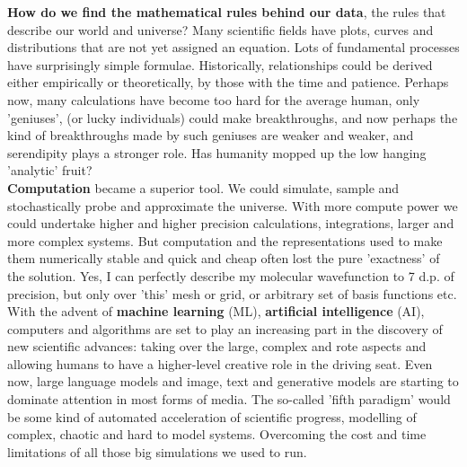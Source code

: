\documentclass{article}
\begin{document}
\textbf{How do we find the mathematical rules behind our data}, the rules that describe our world and universe? Many scientific fields have plots, curves and distributions that are not yet assigned an equation. Lots of fundamental processes have surprisingly simple formulae. Historically, relationships could be derived either empirically or theoretically, by those with the time and patience. Perhaps now, many calculations have become too hard for the average human, only 'geniuses', (or lucky individuals) could make breakthroughs, and now perhaps the kind of breakthroughs made by such geniuses are weaker and weaker, and serendipity plays a stronger role. Has humanity mopped up the low hanging 'analytic' fruit? \\

\textbf{Computation} became a superior tool. We could simulate, sample and stochastically probe and approximate the universe. With more compute power we could undertake higher and higher precision calculations, integrations, larger and more complex systems. But computation and the representations used to make them numerically stable and quick and cheap often lost the pure 'exactness' of the solution. Yes, I can perfectly describe my molecular wavefunction to 7 d.p. of precision, but only over 'this' mesh or grid, or arbitrary set of basis functions etc. \\

With the advent of \textbf{machine learning} (ML), \textbf{artificial intelligence} (AI), computers and algorithms are set to play an increasing part in the discovery of new scientific advances: taking over the large, complex and rote aspects and allowing humans to have a higher-level creative role in the driving seat. Even now, large language models and image, text and generative models are starting to dominate attention in most forms of media. The so-called 'fifth paradigm' would be some kind of automated acceleration of scientific progress, modelling of complex, chaotic and hard to model systems. Overcoming the cost and time limitations of all those big simulations we used to run. \\
\end{document}

